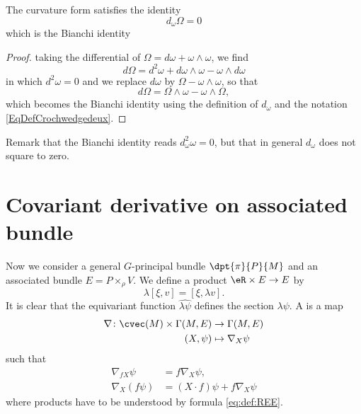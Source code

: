 \begin{proposition}
	The curvature form satisfies the identity
	\begin{equation}
		d_{\omega}\Omega=0
	\end{equation}
	which is the Bianchi identity
\end{proposition}

\begin{proof}
	taking the differential of $\Omega=d\omega+\omega\wedge\omega$, we find
	\[
		d\Omega=d^2\omega+d\omega\wedge\omega-\omega\wedge d\omega
	\]
	in which $d^2\omega=0$ and we replace $d\omega$ by $\Omega-\omega\wedge\omega$, so that
	\[
		d\Omega=\Omega\wedge\omega-\omega\wedge\Omega,
	\]
	which becomes the Bianchi identity using the definition of $d_{\omega}$ and the notation \eqref{EqDefCrochwedgedeux}.
\end{proof}
Remark that the Bianchi identity reads $d_{\omega}^2\omega=0$, but that in general $d_{\omega}$ does not square to zero.

\section{Covariant derivative on associated bundle}

Now we consider a general $G$-principal bundle $\dpt{\pi}{P}{M}$ and an associated bundle $E=P\times_{\rho} V$. We define a product $\eR\times E\to E$ by
\begin{equation}\label{eq:def:REE}
	\lambda[\xi,v]=[\xi,\lambda v].
\end{equation}
It is clear that the equivariant function $\widehat{\lambda \psi}$ defines the section $\lambda\psi$. A  is a map
\begin{equation}
	\begin{aligned}
		\nabla \colon \cvec(M)\times \Gamma(M,E) & \to \Gamma(M,E)      \\
		(X,\psi)                                 & \mapsto \nabla_X\psi
	\end{aligned}
\end{equation}
such that
\begin{subequations}
	\begin{align}
		\nabla_{fX}\psi & =f\nabla_X\psi,                                                                             \\
		\nabla_X(f\psi) & =(X\cdot f)\psi+f\nabla_X\psi                                      \label{eq:def:der_covii}
	\end{align}
\end{subequations}
where products have to be understood by formula \eqref{eq:def:REE}.

